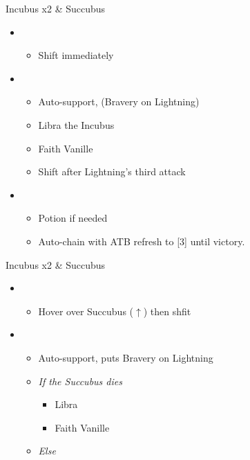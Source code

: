 \begin{paracol}{2}
	\switchcolumn*
	\begin{battle}{Incubus x2 \& Succubus}
		\begin{itemize}
			\item \fourth
			      \begin{itemize}
				      \item Shift immediately
			      \end{itemize}
			\item \second
			      \begin{itemize}
				      \item Auto-support, (Bravery on Lightning)
				      \item Libra the Incubus
				      \item Faith Vanille
				      \item Shift after Lightning's third attack
			      \end{itemize}
			\item \first
			      \begin{itemize}
				      \item Potion if needed
				      \item Auto-chain with ATB refresh to [3] until victory.
			      \end{itemize}
		\end{itemize}
		 
	\end{battle}
	\switchcolumn
	\begin{battle}{Incubus x2 \& Succubus}
		\begin{itemize}
			\item \fourth
			      \begin{itemize}
				      \item Hover over Succubus ($\uparrow$) then shfit
			      \end{itemize}
			\item \second
			      \begin{itemize}
				      \item Auto-support, puts Bravery on Lightning
				      \item \textit{If the Succubus dies}
				            \begin{itemize}
					            \item Libra
					            \item Faith Vanille
				            \end{itemize}
				      \item \textit{Else}
				            \begin{itemize}

\end{itemize}
\end{itemize}
\end{itemize}
\end{battle}
\end{paracol}
